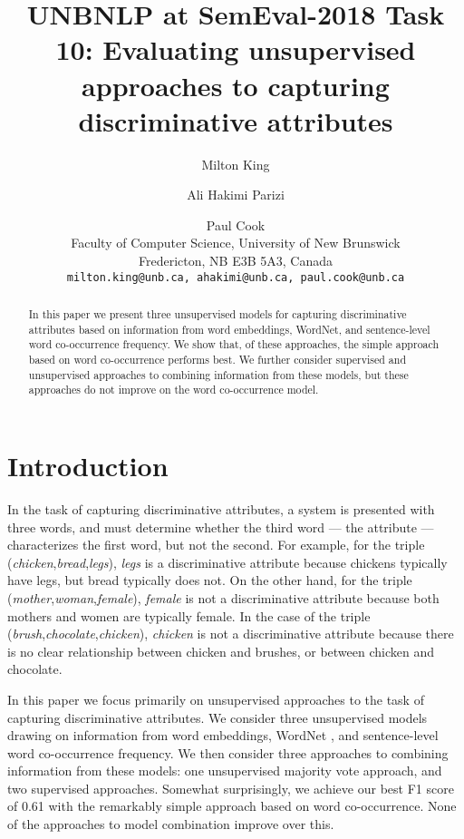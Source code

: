 \documentclass[11pt,a4paper]{article}
\title{UNBNLP at SemEval-2018 Task 10: Evaluating unsupervised
  approaches to capturing discriminative attributes}
\author{Milton King \and Ali Hakimi Parizi \and Paul Cook \\
Faculty of Computer Science, University of New Brunswick\\
Fredericton, NB E3B 5A3, Canada\\
\tt{milton.king@unb.ca}, \tt{ahakimi@unb.ca}, \tt{paul.cook@unb.ca}}
\date{}
\begin{document}
\maketitle
\begin{abstract}
In this paper we present three unsupervised models for capturing
discriminative attributes based on information from word embeddings,
WordNet, and sentence-level word co-occurrence frequency.  We show
that, of these approaches, the simple approach based on word
co-occurrence performs best. We further consider supervised and
unsupervised approaches to combining information from these models,
but these approaches do not improve on the word co-occurrence model.
\end{abstract}

\section{Introduction}

In the task of capturing discriminative attributes, a system is
presented with three words, and must determine whether the third word
--- the attribute --- characterizes the first word, but not the
second. For example, for the triple
(\emph{chicken},\emph{bread},\emph{legs}), \emph{legs} is a
discriminative attribute because chickens typically have legs, but
bread typically does not. On the other hand, for the triple
(\emph{mother},\emph{woman},\emph{female}), \emph{female} is not a
discriminative attribute because both mothers and women are typically
female. In the case of the triple
(\emph{brush},\emph{chocolate},\emph{chicken}), \emph{chicken} is not
a discriminative attribute because there is no clear relationship
between chicken and brushes, or between chicken and chocolate.

In this paper we focus primarily on unsupervised approaches to the
task of capturing discriminative attributes. We consider three
unsupervised models drawing on information from word embeddings,
WordNet \citep{Fellbaum1998}, and sentence-level word co-occurrence
frequency. We then consider three approaches to combining information
from these models: one unsupervised majority vote approach, and two
supervised approaches. Somewhat surprisingly, we achieve our best F1
score of 0.61 with the remarkably simple approach based on word
co-occurrence. None of the approaches to model combination improve
over this.



\end{document}
